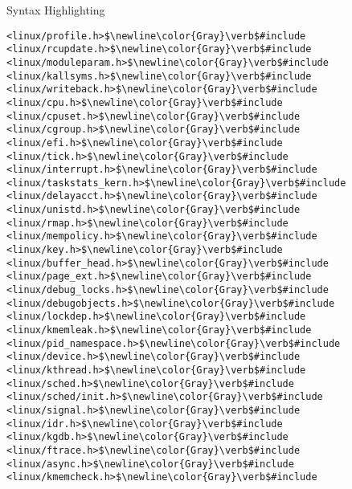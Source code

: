 \begin{frame}{Syntax Highlighting}
\begin{verbatim}
<linux/profile.h>$\newline\color{Gray}\verb$#include <linux/rcupdate.h>$\newline\color{Gray}\verb$#include <linux/moduleparam.h>$\newline\color{Gray}\verb$#include <linux/kallsyms.h>$\newline\color{Gray}\verb$#include <linux/writeback.h>$\newline\color{Gray}\verb$#include <linux/cpu.h>$\newline\color{Gray}\verb$#include <linux/cpuset.h>$\newline\color{Gray}\verb$#include <linux/cgroup.h>$\newline\color{Gray}\verb$#include <linux/efi.h>$\newline\color{Gray}\verb$#include <linux/tick.h>$\newline\color{Gray}\verb$#include <linux/interrupt.h>$\newline\color{Gray}\verb$#include <linux/taskstats_kern.h>$\newline\color{Gray}\verb$#include <linux/delayacct.h>$\newline\color{Gray}\verb$#include <linux/unistd.h>$\newline\color{Gray}\verb$#include <linux/rmap.h>$\newline\color{Gray}\verb$#include <linux/mempolicy.h>$\newline\color{Gray}\verb$#include <linux/key.h>$\newline\color{Gray}\verb$#include <linux/buffer_head.h>$\newline\color{Gray}\verb$#include <linux/page_ext.h>$\newline\color{Gray}\verb$#include <linux/debug_locks.h>$\newline\color{Gray}\verb$#include <linux/debugobjects.h>$\newline\color{Gray}\verb$#include <linux/lockdep.h>$\newline\color{Gray}\verb$#include <linux/kmemleak.h>$\newline\color{Gray}\verb$#include <linux/pid_namespace.h>$\newline\color{Gray}\verb$#include <linux/device.h>$\newline\color{Gray}\verb$#include <linux/kthread.h>$\newline\color{Gray}\verb$#include <linux/sched.h>$\newline\color{Gray}\verb$#include <linux/sched/init.h>$\newline\color{Gray}\verb$#include <linux/signal.h>$\newline\color{Gray}\verb$#include <linux/idr.h>$\newline\color{Gray}\verb$#include <linux/kgdb.h>$\newline\color{Gray}\verb$#include <linux/ftrace.h>$\newline\color{Gray}\verb$#include <linux/async.h>$\newline\color{Gray}\verb$#include <linux/kmemcheck.h>$\newline\color{Gray}\verb$#include 
\end{verbatim}
\end{frame}
